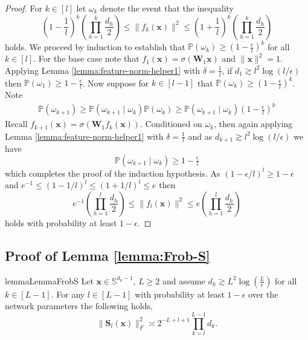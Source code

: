 \documentclass{article}
\theoremstyle{definition}
\renewcommand{\P}{\mathbb{P}}
\renewcommand{\S}{\mathbb{S}}
\def\vx{{\bm{x}}}
\def\mS{{\bm{S}}}
\def\mW{{\bm{W}}}
\begin{document}
\lemmaFeatureNorms*

\begin{proof}
    For $k\in [l]$ let $\omega_k$ denote the event that the inequality
    \[
    \left(1 - \frac{1}{l} \right)^k \left( \prod_{h=1}^k \frac{d_h}{2}\right) \leq \| f_k(\vx) \|^2 \leq \left(1 + \frac{1}{l} \right)^k\left( \prod_{h=1}^k \frac{d_h}{2}\right) 
    \]
    holds. We proceed by induction to establish that $\P(\omega_k) \geq ( 1 - \tfrac{\epsilon}{l})^k$ for all $k \in [l]$. For the base case note that $f_1(\vx) = \sigma(\mW_1 \vx)$ and $\| \vx \|^2 = 1$. Applying Lemma \ref{lemma:feature-norm-helper1} with $\delta = \frac{1}{l}$, if $d_1 \gtrsim l^2 \log(l/\epsilon)$ then $\P(\omega_1) \geq 1 - \tfrac{\epsilon}{l}$. Now suppose for $k \in [l-1]$ that $\P(\omega_k) \geq ( 1 - \tfrac{\epsilon}{l})^k$. Note
    \begin{align*}
    \P(\omega_{k+1}) \geq \P(\omega_{k+1} \mid \omega_k) \P(\omega_k) \geq \P(\omega_{k+1} \mid \omega_k) ( 1 - \tfrac{\epsilon}{l})^k
    \end{align*}
    Recall $f_{k+1}(\vx) = \sigma(\mW_1 f_{k}(\vx))$. Conditioned on $\omega_k$, then again applying Lemma \ref{lemma:feature-norm-helper1} with $\delta = \frac{1}{l}$ and as $d_{k+1} \gtrsim l^2 \log(l/\epsilon)$ we have
    \[
    \P(\omega_{k+1}\mid \omega_k) \geq 1 - \tfrac{\epsilon}{l}
    \]
    which completes the proof of the induction hypothesis. As $(1 - \epsilon/l)^l \geq 1 - \epsilon$ and $ e^{-1} \leq (1 - 1/l)^l \leq (1 + 1/l)^l \leq e$ then
    \[
      e^{-1} \left( \prod_{h=1}^l \frac{d_h}{2}\right) \leq \| f_l(\vx) \|^2 \leq e \left( \prod_{h=1}^l \frac{d_h}{2}\right) 
    \]
    holds with probability at least $1-\epsilon$.
\end{proof}


\subsection{Proof of Lemma \ref{lemma:Frob-S}}\label{app:Frob-S}

\begin{restatable}{lemma}{LemmaFrobS}\label{lemma:Frob-S}
    Let $\vx \in \S^{d_0-1}$, $L \geq 2$ and assume $d_k \gtrsim L^2 \log \left(\frac{L}{\epsilon}\right)$ for all $k \in [L - 1]$. For any $l \in [L - 1]$ with probability at least $1 - \epsilon$ over the network parameters the following holds,
    \[
     \| \mS_{l}(\vx) \|_F^2 \asymp 2^{-L+l+1} \prod_{k = l}^{L-1} d_k.
    \]
\end{restatable}
\end{document}
